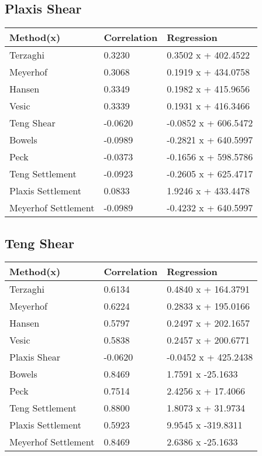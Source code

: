 \subsection{Plaxis Shear}
\begin{tabularx}{\textwidth}{ | p{} | X | X | }
\hline
\textbf{Method(x)} & \textbf{Correlation} & \textbf{Regression} \\
\hline
 Terzaghi & 0.3230 & 0.3502 x + 402.4522\\
 Meyerhof & 0.3068 & 0.1919 x + 434.0758\\
 Hansen & 0.3349 & 0.1982 x + 415.9656\\
 Vesic & 0.3339 & 0.1931 x + 416.3466\\
 Teng Shear & -0.0620 & -0.0852 x + 606.5472\\
 Bowels & -0.0989 & -0.2821 x + 640.5997\\
 Peck & -0.0373 & -0.1656 x + 598.5786\\
 Teng Settlement & -0.0923 & -0.2605 x + 625.4717\\
 Plaxis Settlement & 0.0833 & 1.9246 x + 433.4478\\
 Meyerhof Settlement & -0.0989 & -0.4232 x + 640.5997\\
\hline
\end{tabularx}
\subsection{Teng Shear}
\begin{tabularx}{\textwidth}{ | p{} | X | X | }
\hline
\textbf{Method(x)} & \textbf{Correlation} & \textbf{Regression} \\
\hline
 Terzaghi & 0.6134 & 0.4840 x + 164.3791\\
 Meyerhof & 0.6224 & 0.2833 x + 195.0166\\
 Hansen & 0.5797 & 0.2497 x + 202.1657\\
 Vesic & 0.5838 & 0.2457 x + 200.6771\\
 Plaxis Shear & -0.0620 & -0.0452 x + 425.2438\\
 Bowels & 0.8469 & 1.7591 x  -25.1633\\
 Peck & 0.7514 & 2.4256 x + 17.4066\\
 Teng Settlement & 0.8800 & 1.8073 x + 31.9734\\
 Plaxis Settlement & 0.5923 & 9.9545 x  -319.8311\\
 Meyerhof Settlement & 0.8469 & 2.6386 x  -25.1633\\
\hline
\end{tabularx}
